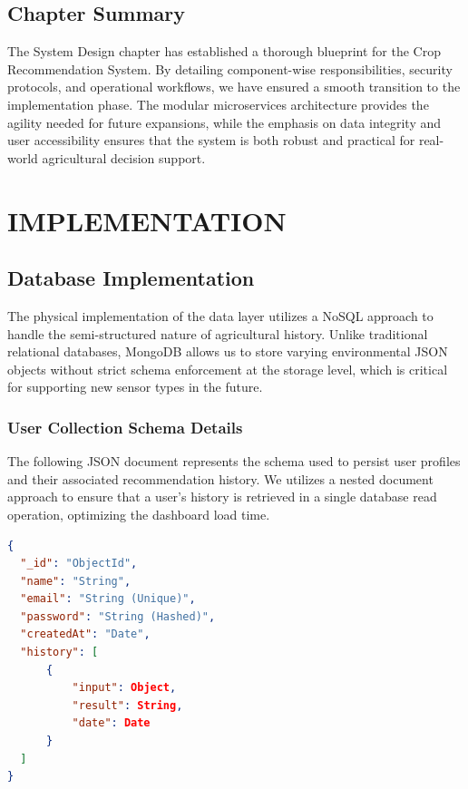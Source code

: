 \documentclass[12pt,a4paper]{report}
\begin{document}
\section{Chapter Summary}
The System Design chapter has established a thorough blueprint for the Crop Recommendation System. By detailing component-wise responsibilities, security protocols, and operational workflows, we have ensured a smooth transition to the implementation phase. The modular microservices architecture provides the agility needed for future expansions, while the emphasis on data integrity and user accessibility ensures that the system is both robust and practical for real-world agricultural decision support.
\chapter{IMPLEMENTATION}
\label{ch:5}

\section{Database Implementation}
The physical implementation of the data layer utilizes a NoSQL approach to handle the semi-structured nature of agricultural history. Unlike traditional relational databases, MongoDB allows us to store varying environmental JSON objects without strict schema enforcement at the storage level, which is critical for supporting new sensor types in the future.
\subsection{User Collection Schema Details}
The following JSON document represents the schema used to persist user profiles and their associated recommendation history. We utilizes a nested document approach to ensure that a user's history is retrieved in a single database read operation, optimizing the dashboard load time.
\begin{lstlisting}[language=json]
{
  "_id": "ObjectId",
  "name": "String",
  "email": "String (Unique)",
  "password": "String (Hashed)",
  "createdAt": "Date",
  "history": [
      {
          "input": Object,
          "result": String,
          "date": Date
      }
  ]
}
\end{lstlisting}
\end{document}
